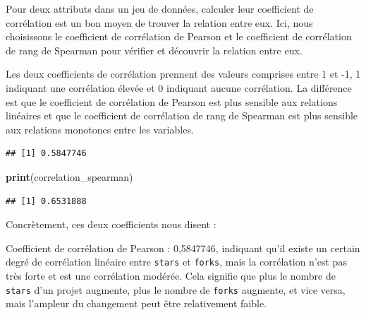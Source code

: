 \documentclass[
]{article}
\newenvironment{Shaded}{\begin{snugshade}}{\end{snugshade}}
\newcommand{\AttributeTok}[1]{\textcolor[rgb]{0.13,0.29,0.53}{#1}}
\newcommand{\FunctionTok}[1]{\textcolor[rgb]{0.13,0.29,0.53}{\textbf{#1}}}
\newcommand{\NormalTok}[1]{#1}
\newcommand{\OtherTok}[1]{\textcolor[rgb]{0.56,0.35,0.01}{#1}}
\newcommand{\SpecialCharTok}[1]{\textcolor[rgb]{0.81,0.36,0.00}{\textbf{#1}}}
\newcommand{\StringTok}[1]{\textcolor[rgb]{0.31,0.60,0.02}{#1}}
\begin{document}
Pour deux attributs dans un jeu de données, calculer leur coefficient de
corrélation est un bon moyen de trouver la relation entre eux. Ici, nous
choisissons le coefficient de corrélation de Pearson et le coefficient
de corrélation de rang de Spearman pour vérifier et découvrir la
relation entre eux.

Les deux coefficients de corrélation prennent des valeurs comprises
entre 1 et -1, 1 indiquant une corrélation élevée et 0 indiquant aucune
corrélation. La différence est que le coefficient de corrélation de
Pearson est plus sensible aux relations linéaires et que le coefficient
de corrélation de rang de Spearman est plus sensible aux relations
monotones entre les variables.

\begin{Shaded}
\end{Shaded}

\begin{verbatim}
## [1] 0.5847746
\end{verbatim}

\begin{Shaded}
\begin{Highlighting}[]
\FunctionTok{print}\NormalTok{(correlation\_spearman)}
\end{Highlighting}
\end{Shaded}

\begin{verbatim}
## [1] 0.6531888
\end{verbatim}

Concrètement, ces deux coefficients nous disent :

Coefficient de corrélation de Pearson : 0,5847746, indiquant qu'il
existe un certain degré de corrélation linéaire entre \texttt{stars} et
\texttt{forks}, mais la corrélation n'est pas très forte et est une
corrélation modérée. Cela signifie que plus le nombre de \texttt{stars}
d'un projet augmente, plus le nombre de \texttt{forks} augmente, et vice
versa, mais l'ampleur du changement peut être relativement faible.
\end{document}
